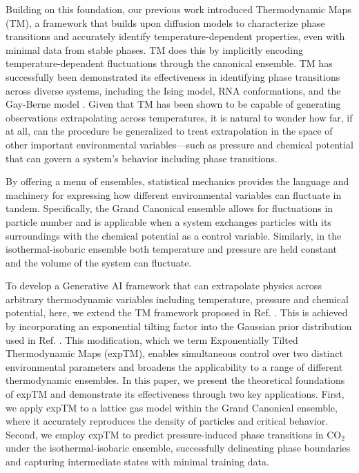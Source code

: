 \documentclass[aip,jcp,reprint,longbibliography]{revtex4-1}
\begin{document}
Building on this foundation, our previous work introduced Thermodynamic Maps (TM),\cite{herron2024inferring} a framework that builds upon diffusion models to characterize phase transitions and accurately identify temperature-dependent properties, even with minimal data from stable phases. TM does this by implicitly encoding temperature-dependent fluctuations through the canonical ensemble. TM has successfully been demonstrated its effectiveness in identifying phase transitions across diverse systems, including the Ising model, RNA conformations, and the Gay-Berne model \cite{herron2024inferring, beyerle2024inferring}. Given that TM has been shown to be capable of generating observations extrapolating across temperatures, it is natural to wonder how far, if at all, can the procedure be generalized to treat extrapolation in the space of other important environmental variables—such as pressure and chemical potential that can govern a system’s behavior including phase transitions.


By offering a menu of ensembles, statistical mechanics provides the language and machinery for expressing how different environmental variables can fluctuate in tandem. Specifically, the Grand Canonical ensemble allows for fluctuations in particle number and is applicable when a system exchanges particles with its surroundings with the chemical potential as a control variable. Similarly, in the isothermal-isobaric ensemble both temperature and pressure are held constant and the volume of the system can fluctuate. 

To develop a Generative AI framework that can extrapolate physics across arbitrary thermodynamic variables including temperature, pressure and chemical potential, here, we extend the TM framework proposed in Ref. . This is achieved by incorporating an exponential tilting factor into the Gaussian prior distribution used in  Ref. . This modification, which we term Exponentially Tilted Thermodynamic Maps (expTM), enables simultaneous control over two distinct environmental parameters and broadens the applicability to a range of different thermodynamic ensembles. In this paper, we present the theoretical foundations of expTM and demonstrate its effectiveness through two key applications. First, we apply expTM to a lattice gas model within the Grand Canonical ensemble, where it accurately reproduces the density of particles and critical behavior. Second, we employ expTM to predict pressure-induced phase transitions in CO$_2$ under the isothermal-isobaric ensemble, successfully delineating phase boundaries and capturing intermediate states with minimal training data.
\end{document}

